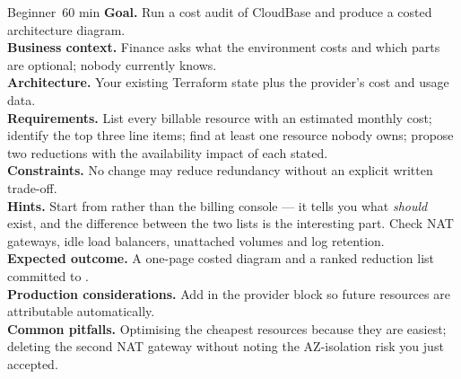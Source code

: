
\begin{minilab}{Beginner}{~60 min}
\textbf{Goal.} Run a cost audit of CloudBase and produce a costed architecture diagram.\\
\textbf{Business context.} Finance asks what the environment costs and which parts are optional; nobody currently knows.\\
\textbf{Architecture.} Your existing Terraform state plus the provider's cost and usage data.\\
\textbf{Requirements.} List every billable resource with an estimated monthly cost; identify the top three line items; find at least one resource nobody owns; propose two reductions with the availability impact of each stated.\\
\textbf{Constraints.} No change may reduce redundancy without an explicit written trade-off.\\
\textbf{Hints.} Start from  rather than the billing console --- it tells you what \emph{should} exist, and the difference between the two lists is the interesting part. Check NAT gateways, idle load balancers, unattached volumes and log retention.\\
\textbf{Expected outcome.} A one-page costed diagram and a ranked reduction list committed to .\\
\textbf{Production considerations.} Add  in the provider block so future resources are attributable automatically.\\
\textbf{Common pitfalls.} Optimising the cheapest resources because they are easiest; deleting the second NAT gateway without noting the AZ-isolation risk you just accepted.
\end{minilab}

